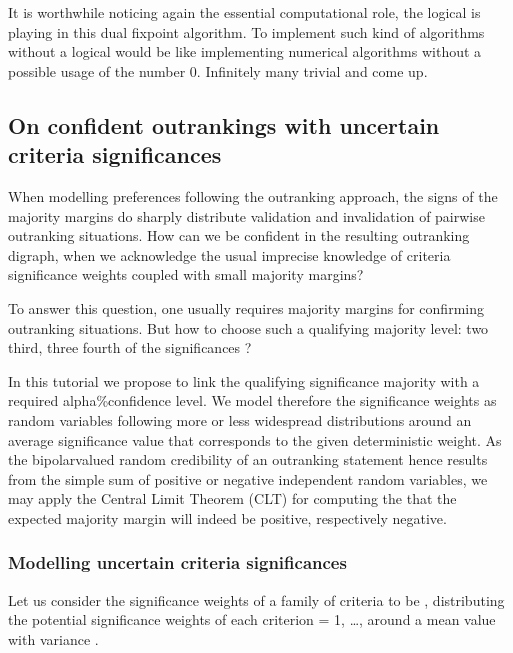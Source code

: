 \documentclass[a4paper,10pt,english]{sphinxhowto}
\begin{document}
It is worthwhile noticing again the essential computational role, the logical  is playing in this dual fixpoint algorithm. To implement such kind of algorithms without a logical  would be like implementing numerical algorithms without a possible usage of the number 0. Infinitely many trivial  and  come up.


\subsection{On confident outrankings with uncertain criteria significances}
\label{\detokenize{tutorial:on-confident-outrankings-with-uncertain-criteria-significances}}\label{\detokenize{tutorial:bipolar-valued-likelihood-tutorial-label}}
When modelling preferences following the outranking approach, the signs of the majority margins do sharply distribute validation and invalidation of pairwise outranking situations. How can we be confident in the resulting outranking digraph, when we acknowledge the usual imprecise knowledge of criteria significance weights coupled with small majority margins?

To answer this question, one usually requires  majority margins for confirming outranking situations. But how to choose such a qualifying majority level: two third, three fourth of the significances ?

In this tutorial we propose to link the qualifying significance majority with a required alpha\%\sphinxhyphen{}confidence level. We model therefore the significance weights as random variables following more or less widespread distributions around an average significance value that corresponds to the given deterministic weight. As the bipolar\sphinxhyphen{}valued random credibility of an outranking statement hence results from the simple sum of positive or negative independent random variables, we may apply the Central Limit Theorem (CLT) for computing the  that the expected majority margin will indeed be positive, respectively negative.


\subsubsection{Modelling uncertain criteria significances}
\label{\detokenize{tutorial:modelling-uncertain-criteria-significances}}
Let us consider the significance weights of a family  of  criteria to be  , distributing the potential significance weights of each criterion  = 1, …,  around a mean value  with variance .
\end{document}
